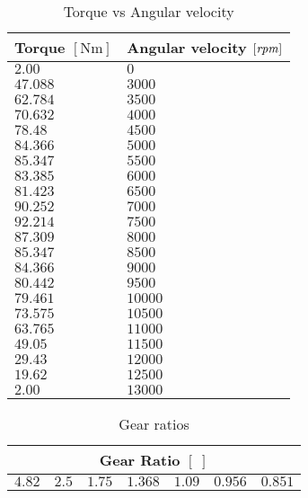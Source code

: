 %
\begin{table}[h!]
    \centering
    \caption{Torque vs Angular velocity}
    \label{tab:wheelcoordinates}
    \begin{tabular}{@{}ll@{}}
    \toprule
    \multicolumn{1}{l}{\textbf{Torque} $[\si{\newton\metre}]$} & \multicolumn{1}{l}{\textbf{Angular velocity $[\it rpm]$}} \\ \midrule
    $2.00  $  &  $0    $ \\
    $47.088$  &  $3000 $ \\
    $62.784$  &  $3500 $ \\
    $70.632$  &  $4000 $ \\
    $78.48 $  &  $4500 $ \\
    $84.366$  &  $5000 $ \\
    $85.347$  &  $5500 $ \\
    $83.385$  &  $6000 $ \\
    $81.423$  &  $6500 $ \\
    $90.252$  &  $7000 $ \\
    $92.214$  &  $7500 $ \\
    $87.309$  &  $8000 $ \\
    $85.347$  &  $8500 $ \\
    $84.366$  &  $9000 $ \\
    $80.442$  &  $9500 $ \\
    $79.461$  &  $10000$ \\
    $73.575$  &  $10500$ \\
    $63.765$  &  $11000$ \\
    $49.05 $  &  $11500$ \\
    $29.43 $  &  $12000$ \\
    $19.62 $  &  $12500$ \\
    $2.00  $  &  $13000$ \\ 
    \bottomrule
    \end{tabular}
\end{table}
%

%
\begin{table}[h!]
    \centering
    \caption{Gear ratios}
    \label{tab:wheelcoordinates}
    \begin{tabular}{@{}ccccccc@{}}
    \toprule
    \multicolumn{7}{c}{\textbf{Gear Ratio} $[\;]$} \\ \midrule
        $4.82$ & $2.5$ & $1.75$ & $1.368$ & $1.09$ & $0.956$ & $0.851$\\
    \bottomrule
    \end{tabular}
\end{table}
%



